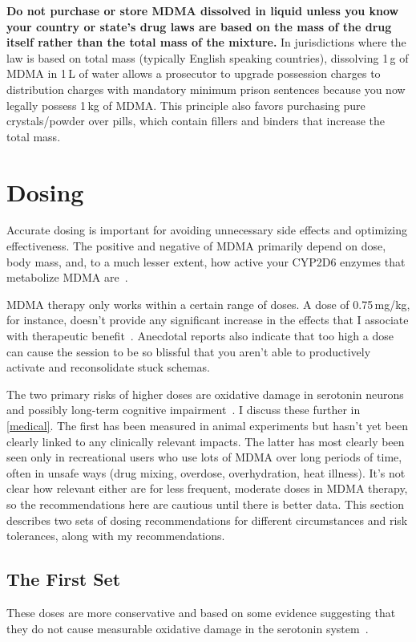 \documentclass[11pt,oneside]{book}
\let\cite\parencite
\begin{document}
\textbf{Do not purchase or store MDMA dissolved in liquid unless you know your country or state's drug laws are based on the mass of the drug itself rather than the total mass of the mixture.} In jurisdictions where the law is based on total mass (typically English speaking countries), dissolving 1\,g of MDMA in 1\,L of water allows a prosecutor to upgrade possession charges to distribution charges with mandatory minimum prison sentences because you now legally possess 1\,kg of MDMA. This principle also favors purchasing pure crystals/powder over pills, which contain fillers and binders that increase the total mass.

\section{Dosing}
\label{sec:dosing}
Accurate dosing is important for avoiding unnecessary side effects and optimizing effectiveness. The positive and negative of MDMA primarily depend on dose, body mass, and, to a much lesser extent, how active your CYP2D6 enzymes that metabolize MDMA are~\cite{studerusResponse}.

MDMA therapy only works within a certain range of doses. A dose of 0.75\,mg/kg, for instance, doesn't provide any significant increase in the effects that I associate with therapeutic benefit~\cite{bediMDMALowDose}. Anecdotal reports also indicate that too high a dose can cause the session to be so blissful that you aren't able to productively activate and reconsolidate stuck schemas.

The two primary risks of higher doses are oxidative damage in serotonin neurons and possibly long-term cognitive impairment~\cite{baggottDamage}. I discuss these further in \cref{medical}. The first has been measured in animal experiments but hasn't yet been clearly linked to any clinically relevant impacts. The latter has most clearly been seen only in recreational users who use lots of MDMA over long periods of time, often in unsafe ways (drug mixing, overdose, overhydration, heat illness). It's not clear how relevant either are for less frequent, moderate doses in MDMA therapy, so the recommendations here are cautious until there is better data. This section describes two sets of dosing recommendations for different circumstances and risk tolerances, along with my recommendations.

\subsection*{The First Set}
These doses are more conservative and based on some evidence suggesting that they do not cause measurable oxidative damage in the serotonin system~\cite{baggottSupplements}.
\end{document}
